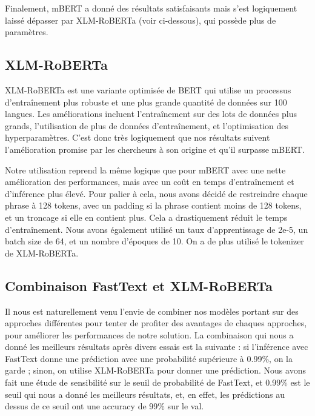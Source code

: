 Finalement, mBERT a donné des résultats satisfaisants mais s'est logiquement laissé dépasser par XLM-RoBERTa (voir ci-dessous), qui possède plus de paramètres.

\subsection{XLM-RoBERTa}

XLM-RoBERTa \cite{conneau2020unsupervised} est une variante optimisée de BERT \cite{devlin2019bert} qui utilise un processus d'entraînement plus robuste et une plus grande quantité de données sur 100 langues. Les améliorations incluent l'entraînement sur des lots de données plus grands, l'utilisation de plus de données d'entraînement, et l'optimisation des hyperparamètres. C'est donc très logiquement que nos résultats suivent l'amélioration promise par les chercheurs à son origine et qu'il surpasse mBERT.

Notre utilisation reprend la même logique que pour mBERT avec une nette amélioration des performances, mais avec un coût en temps d'entraînement et d'inférence plus élevé. Pour palier à cela, nous avons décidé de restreindre chaque phrase à 128 tokens, avec un padding si la phrase contient moins de 128 tokens, et un troncage si elle en contient plus. Cela a drastiquement réduit le temps d'entraînement. Nous avons également utilisé un taux d'apprentissage de 2e-5, un batch size de 64, et un nombre d'époques de 10. On a de plus utilisé le tokenizer de XLM-RoBERTa.

\subsection{Combinaison FastText et XLM-RoBERTa}

Il nous est naturellement venu l'envie de combiner nos modèles portant sur des approches différentes pour tenter de profiter des avantages de chaques approches, pour améliorer les performances de notre solution. La combinaison qui nous a donné les meilleurs résultats après divers essais est la suivante : si l'inférence avec FastText donne une prédiction avec une probabilité supérieure à 0.99\%, on la garde ; sinon, on utilise XLM-RoBERTa pour donner une prédiction. Nous avons fait une étude de sensibilité sur le seuil de probabilité de FastText, et 0.99\% est le seuil qui nous a donné les meilleurs résultats, et, en effet, les prédictions au dessus de ce seuil ont une accuracy de 99\% sur le val.